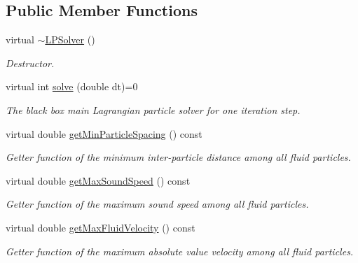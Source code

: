 \subsection*{Public Member Functions}
\begin{DoxyCompactItemize}
\item 
\hypertarget{classLPSolver_a9fbbdc7648d046971c74ff7ca458433e}{virtual \hyperlink{classLPSolver_a9fbbdc7648d046971c74ff7ca458433e}{$\sim$\-L\-P\-Solver} ()}\label{classLPSolver_a9fbbdc7648d046971c74ff7ca458433e}

\begin{DoxyCompactList}\small\item\em Destructor. \end{DoxyCompactList}\item 
virtual int \hyperlink{classLPSolver_a5cac44bfd7d885abab818841471b457a}{solve} (double dt)=0
\begin{DoxyCompactList}\small\item\em The black box main Lagrangian particle solver for one iteration step. \end{DoxyCompactList}\item 
virtual double \hyperlink{classLPSolver_ac0c1a883511a0cb36d5e87db2749f1f7}{get\-Min\-Particle\-Spacing} () const 
\begin{DoxyCompactList}\small\item\em Getter function of the minimum inter-\/particle distance among all fluid particles. \end{DoxyCompactList}\item 
virtual double \hyperlink{classLPSolver_a1f8a8c7fee212b55e6c4fbb8a2f5213b}{get\-Max\-Sound\-Speed} () const 
\begin{DoxyCompactList}\small\item\em Getter function of the maximum sound speed among all fluid particles. \end{DoxyCompactList}\item 
virtual double \hyperlink{classLPSolver_a1b6395ab3455bfb747bb3fd55301ddce}{get\-Max\-Fluid\-Velocity} () const 
\begin{DoxyCompactList}\small\item\em Getter function of the maximum absolute value velocity among all fluid particles. \end{DoxyCompactList}\end{DoxyCompactItemize}
